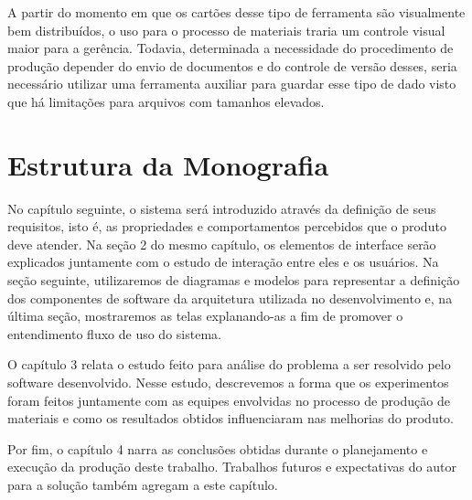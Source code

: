 A partir do momento em que os cartões desse tipo de ferramenta são visualmente bem distribuídos, o uso para o processo de materiais traria um controle visual maior para a gerência. Todavia, determinada a necessidade do procedimento de produção depender do envio de documentos e do controle de versão desses, seria necessário utilizar uma ferramenta auxiliar para guardar esse tipo de dado visto que há limitações para arquivos com tamanhos elevados.

\section{Estrutura da Monografia}

No capítulo seguinte, o sistema será introduzido através da definição de seus requisitos, isto é, as propriedades e comportamentos percebidos que o produto deve atender. Na seção 2 do mesmo capítulo, os elementos de interface serão explicados juntamente com o estudo de interação entre eles e os usuários. Na seção seguinte, utilizaremos de diagramas e modelos para representar a definição dos componentes de software da arquitetura utilizada no desenvolvimento e, na última seção, mostraremos as telas explanando-as a fim de promover o entendimento fluxo de uso do sistema.

O capítulo 3 relata o estudo feito para análise do problema a ser resolvido pelo software desenvolvido. Nesse estudo, descrevemos a forma que os experimentos foram feitos juntamente com as equipes envolvidas no processo de produção de materiais e como os resultados obtidos influenciaram nas melhorias do produto.

Por fim, o capítulo 4 narra as  conclusões obtidas durante o planejamento e execução da produção deste trabalho. Trabalhos futuros e expectativas do autor para a solução também agregam a este capítulo.

